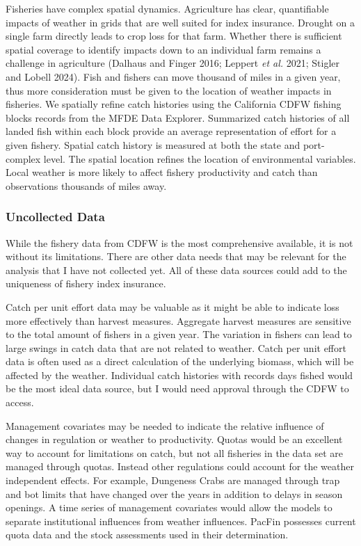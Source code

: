 \documentclass[
  letterpaper,
  DIV=11,
  numbers=noendperiod]{scrartcl}
\begin{document}
Fisheries have complex spatial dynamics. Agriculture has clear,
quantifiable impacts of weather in grids that are well suited for index
insurance. Drought on a single farm directly leads to crop loss for that
farm. Whether there is sufficient spatial coverage to identify impacts
down to an individual farm remains a challenge in agriculture (Dalhaus
and Finger 2016; Leppert \emph{et al.} 2021; Stigler and Lobell 2024).
Fish and fishers can move thousand of miles in a given year, thus more
consideration must be given to the location of weather impacts in
fisheries. We spatially refine catch histories using the California CDFW
fishing blocks records from the MFDE Data Explorer. Summarized catch
histories of all landed fish within each block provide an average
representation of effort for a given fishery. Spatial catch history is
measured at both the state and port-complex level. The spatial location
refines the location of environmental variables. Local weather is more
likely to affect fishery productivity and catch than observations
thousands of miles away.

\hypertarget{uncollected-data}{%
\subsubsection{Uncollected Data}\label{uncollected-data}}

While the fishery data from CDFW is the most comprehensive available, it
is not without its limitations. There are other data needs that may be
relevant for the analysis that I have not collected yet. All of these
data sources could add to the uniqueness of fishery index insurance.

Catch per unit effort data may be valuable as it might be able to
indicate loss more effectively than harvest measures. Aggregate harvest
measures are sensitive to the total amount of fishers in a given year.
The variation in fishers can lead to large swings in catch data that are
not related to weather. Catch per unit effort data is often used as a
direct calculation of the underlying biomass, which will be affected by
the weather. Individual catch histories with records days fished would
be the most ideal data source, but I would need approval through the
CDFW to access.

Management covariates may be needed to indicate the relative influence
of changes in regulation or weather to productivity. Quotas would be an
excellent way to account for limitations on catch, but not all fisheries
in the data set are managed through quotas. Instead other regulations
could account for the weather independent effects. For example,
Dungeness Crabs are managed through trap and bot limits that have
changed over the years in addition to delays in season openings. A time
series of management covariates would allow the models to separate
institutional influences from weather influences. PacFin possesses
current quota data and the stock assessments used in their
determination.
\end{document}
